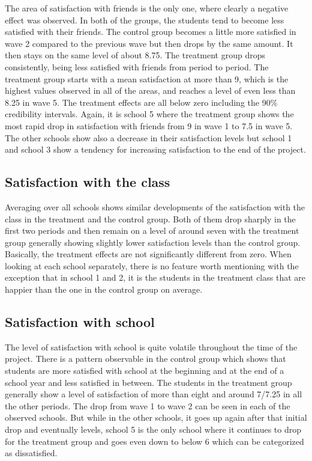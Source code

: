 \documentclass[a4, 12pt]{article}
\begin{document}
\label{sec:results-friends}
The area of satisfaction with friends is the only one, where clearly a negative effect was observed. In both of the groups, the students tend to become less satisfied with their friends. The control group becomes a little more satisfied in wave 2 compared to the previous wave but then drops by the same amount. It then stays on the same level of about 8.75. The treatment group drops consistently, being less satisfied with friends from period to period. The treatment group starts with a mean satisfaction at more than 9, which is the highest values observed in all of the areas, and reaches a level of even less than 8.25 in wave 5. The treatment effects are all below zero including the 90\% credibility intervals. Again, it is school 5 where the treatment group shows the most rapid drop in satisfaction with friends from 9 in wave 1 to 7.5 in wave 5. The other schools show also a decrease in their satisfaction levels but school 1 and school 3 show a tendency for increasing satisfaction to the end of the project.

\hypertarget{satisfaction-with-the-class}{%
\subsection{Satisfaction with the class}\label{satisfaction-with-the-class}}

\label{sec:results-class}
Averaging over all schools shows similar developments of the satisfaction with the class in the treatment and the control group. Both of them drop sharply in the first two periods and then remain on a level of around seven with the treatment group generally showing slightly lower satisfaction levels than the control group. Basically, the treatment effects are not significantly different from zero.
When looking at each school separately, there is no feature worth mentioning with the exception that in school 1 and 2, it is the students in the treatment class that are happier than the one in the control group on average.

\hypertarget{satisfaction-with-school}{%
\subsection{Satisfaction with school}\label{satisfaction-with-school}}

\label{sec:results-school}
The level of satisfaction with school is quite volatile throughout the time of the project. There is a pattern observable in the control group which shows that students are more satisfied with school at the beginning and at the end of a school year and less satisfied in between. The students in the treatment group generally show a level of satisfaction of more than eight and around 7/7.25 in all the other periods. The drop from wave 1 to wave 2 can be seen in each of the observed schools. But while in the other schools, it goes up again after that initial drop and eventually levels, school 5 is the only school where it continues to drop for the treatment group and goes even down to below 6 which can be categorized as dissatisfied.
\end{document}
